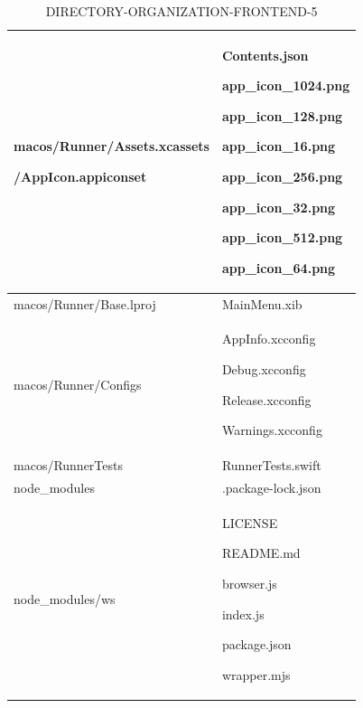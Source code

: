 \documentclass[conference]{IEEEtran}
\begin{document}
\begin{table}[h]
\caption{DIRECTORY-ORGANIZATION-FRONTEND-5}
\def\arraystretch{1.24} \small
    \begin{tabular}{|p{3.7cm}|p{4.1cm}|}
\hline


        macos/Runner/Assets.xcassets \par /AppIcon.appiconset \par   & \par Contents.json \par app\_icon\_1024.png \par app\_icon\_128.png \par app\_icon\_16.png \par app\_icon\_256.png \par app\_icon\_32.png \par app\_icon\_512.png \par app\_icon\_64.png
        \\ \hline

        macos/Runner/Base.lproj   & \par MainMenu.xib
        \\ \hline

        macos/Runner/Configs \par   & \par AppInfo.xcconfig \par Debug.xcconfig \par Release.xcconfig \par Warnings.xcconfig
        \\ \hline

        macos/RunnerTests  & \par RunnerTests.swift
        \\ \hline

        node\_modules   & \par .package-lock.json
        \\ \hline

        node\_modules/ws   & \par LICENSE \par README.md \par browser.js \par index.js \par package.json \par wrapper.mjs
        \\ \hline


\end{tabular}
\end{table}
\end{document}
